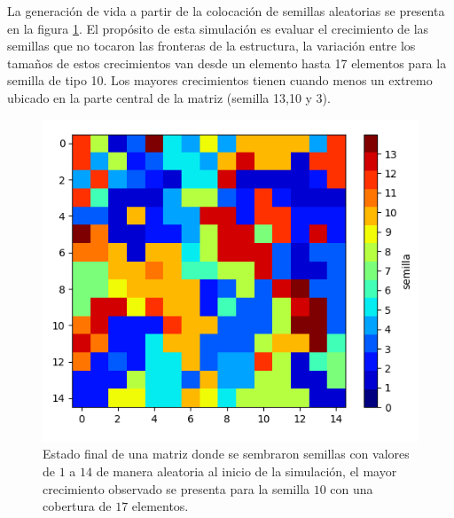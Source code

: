 \documentclass{article}
\begin{document}
La generación de vida a partir de la colocación de semillas aleatorias se presenta en la figura \ref{semillas}. El propósito de esta simulación es evaluar el crecimiento de las semillas que no tocaron las fronteras de la estructura, la variación entre los tamaños de estos crecimientos van desde un elemento hasta 17 elementos para la semilla de tipo 10. Los mayores crecimientos tienen cuando menos un extremo ubicado en la parte central de la matriz (semilla 13,10 y 3). 
\begin{figure} 
    \centering
    \includegraphics[width=140mm]{semillas.png} 
    \caption{Estado final de una matriz donde se sembraron semillas con valores de $1$ a $14$ de manera aleatoria al inicio de la simulación, el mayor crecimiento observado se presenta para la semilla $10$ con una cobertura de $17$ elementos.}
    \label{semillas}
\end{figure}
\end{document}
